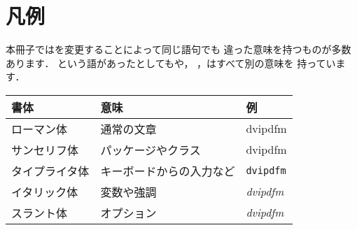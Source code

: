 \section*{凡例}

本冊子ではを変更することによって同じ語句でも
違った意味を持つものが多数あります．
という語があったとしてもや，
，はすべて別の意味を
持っています．
\begin{center}
%
 \begin{tabular}{lll}
\hline
 書体          & 意味      & 例 \\
\hline
 ローマン体    & 通常の文章& \textrm{dvipdfm}\\
 サンセリフ体  & パッケージやクラス& \textsf{dvipdfm}\\
 タイプライタ体& キーボードからの入力など& \texttt{dvipdfm}\\
 イタリック体  & 変数や強調& \textit{dvipdfm}\\
 スラント体    & オプション& \textsl{dvipdfm}\\
\hline
 \end{tabular}
\end{center}

%

